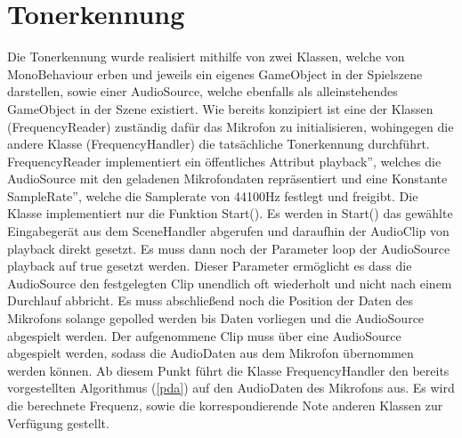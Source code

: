 \section{Tonerkennung}

Die Tonerkennung wurde realisiert mithilfe von zwei Klassen, welche von MonoBehaviour erben und jeweils ein eigenes GameObject in der Spielszene darstellen, sowie einer AudioSource, welche ebenfalls als alleinstehendes GameObject in der Szene existiert. Wie bereits konzipiert ist eine der Klassen (FrequencyReader) zuständig dafür das Mikrofon zu initialisieren, wohingegen die andere Klasse (FrequencyHandler) die tatsächliche Tonerkennung durchführt. \\
FrequencyReader implementiert ein öffentliches Attribut \glqq playback'', welches die AudioSource mit den geladenen Mikrofondaten repräsentiert und eine Konstante \glqq SampleRate'', welche die Samplerate von 44100Hz festlegt und freigibt. Die Klasse implementiert nur die Funktion Start(). Es werden in Start() das gewählte Eingabegerät aus dem SceneHandler abgerufen und daraufhin der AudioClip von playback direkt gesetzt. Es muss dann noch der Parameter loop der AudioSource playback auf true gesetzt werden. Dieser Parameter ermöglicht es dass die AudioSource den festgelegten Clip unendlich oft wiederholt und nicht nach einem Durchlauf abbricht. Es muss abschließend noch die Position der Daten des Mikrofons solange gepolled werden bis Daten vorliegen und die AudioSource abgespielt werden. Der aufgenommene Clip muss über eine AudioSource abgespielt werden, sodass die AudioDaten aus dem Mikrofon übernommen werden können. Ab diesem Punkt führt die Klasse FrequencyHandler den bereits vorgestellten Algorithmus (\ref{pda}) auf den AudioDaten des Mikrofons aus. Es wird die berechnete Frequenz, sowie die korrespondierende Note anderen Klassen zur Verfügung gestellt. 

